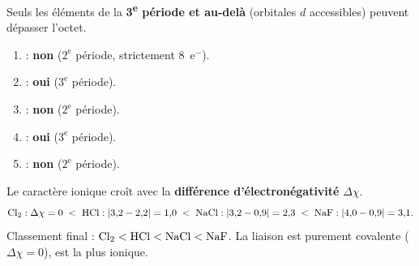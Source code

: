 \documentclass[11pt,a4paper]{article}
\begin{document}
\begin{corrige}
Seuls les éléments de la \textbf{3\textsuperscript{e} période et au-delà} (orbitales $d$
accessibles) peuvent dépasser l'octet.
\begin{enumerate}[label=\alph*)]
  \item {} : \textbf{non} ($2^{\text{e}}$ période, strictement $8$~e$^-$).
  \item {} : \textbf{oui} ($3^{\text{e}}$ période).
  \item {} : \textbf{non} ($2^{\text{e}}$ période).
  \item {} : \textbf{oui} ($3^{\text{e}}$ période).
  \item {} : \textbf{non} ($2^{\text{e}}$ période).
\end{enumerate}
\end{corrige}

\begin{corrige}
Le caractère ionique croît avec la \textbf{différence d'électronégativité} $\Delta\chi$.
\[ \ce{Cl2} : \Delta\chi = 0 \;<\; \ce{HCl} : |3{,}2-2{,}2| = 1{,}0 \;<\;
   \ce{NaCl} : |3{,}2-0{,}9| = 2{,}3 \;<\; \ce{NaF} : |4{,}0-0{,}9| = 3{,}1. \]
Classement final : $\ce{Cl2} < \ce{HCl} < \ce{NaCl} < \ce{NaF}$. La liaison  est purement
covalente ($\Delta\chi = 0$),  est la plus ionique.
\end{corrige}
\end{document}

